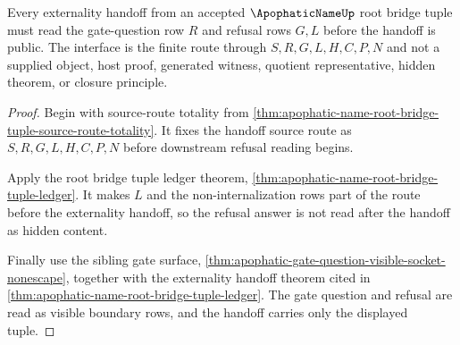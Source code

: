 \begin{theorem}
\label{thm:apophatic-name-root-bridge-tuple-gate-refusal-interface}
Every externality handoff from an accepted $\ApophaticNameUp$ root bridge tuple must read the gate-question row $R$ and refusal rows $G,L$ before the handoff is public. The interface is the finite route through $S,R,G,L,H,C,P,N$ and not a supplied object, host proof, generated witness, quotient representative, hidden theorem, or closure principle.
\end{theorem}
\begin{proof}
Begin with source-route totality from \autoref{thm:apophatic-name-root-bridge-tuple-source-route-totality}. It fixes the handoff source route as $S,R,G,L,H,C,P,N$ before downstream refusal reading begins.

Apply the root bridge tuple ledger theorem, \autoref{thm:apophatic-name-root-bridge-tuple-ledger}. It makes $L$ and the non-internalization rows part of the route before the externality handoff, so the refusal answer is not read after the handoff as hidden content.

Finally use the sibling gate surface, \autoref{thm:apophatic-gate-question-visible-socket-nonescape}, together with the externality handoff theorem cited in \autoref{thm:apophatic-name-root-bridge-tuple-ledger}. The gate question and refusal are read as visible boundary rows, and the handoff carries only the displayed tuple.
\end{proof}

